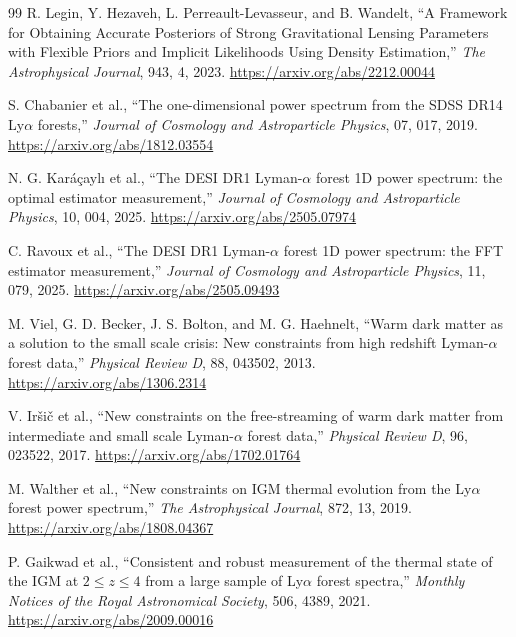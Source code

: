 \begin{thebibliography}{99}
R. Legin, Y. Hezaveh, L. Perreault-Levasseur, and B. Wandelt,
``A Framework for Obtaining Accurate Posteriors of Strong Gravitational Lensing Parameters with Flexible Priors and Implicit Likelihoods Using Density Estimation,''
\emph{The Astrophysical Journal}, 943, 4, 2023.
\url{https://arxiv.org/abs/2212.00044}

S. Chabanier et al.,
``The one-dimensional power spectrum from the SDSS DR14 Ly$\alpha$ forests,''
\emph{Journal of Cosmology and Astroparticle Physics}, 07, 017, 2019.
\url{https://arxiv.org/abs/1812.03554}

N. G. Kar\'a\c{c}ayl{\i} et al.,
``The DESI DR1 Lyman-$\alpha$ forest 1D power spectrum: the optimal estimator measurement,''
\emph{Journal of Cosmology and Astroparticle Physics}, 10, 004, 2025.
\url{https://arxiv.org/abs/2505.07974}

C. Ravoux et al.,
``The DESI DR1 Lyman-$\alpha$ forest 1D power spectrum: the FFT estimator measurement,''
\emph{Journal of Cosmology and Astroparticle Physics}, 11, 079, 2025.
\url{https://arxiv.org/abs/2505.09493}

M. Viel, G. D. Becker, J. S. Bolton, and M. G. Haehnelt,
``Warm dark matter as a solution to the small scale crisis: New constraints from high redshift Lyman-$\alpha$ forest data,''
\emph{Physical Review D}, 88, 043502, 2013.
\url{https://arxiv.org/abs/1306.2314}

V. Ir\v{s}i\v{c} et al.,
``New constraints on the free-streaming of warm dark matter from intermediate and small scale Lyman-$\alpha$ forest data,''
\emph{Physical Review D}, 96, 023522, 2017.
\url{https://arxiv.org/abs/1702.01764}

M. Walther et al.,
``New constraints on IGM thermal evolution from the Ly$\alpha$ forest power spectrum,''
\emph{The Astrophysical Journal}, 872, 13, 2019.
\url{https://arxiv.org/abs/1808.04367}

P. Gaikwad et al.,
``Consistent and robust measurement of the thermal state of the IGM at $2\le z\le4$ from a large sample of Ly$\alpha$ forest spectra,''
\emph{Monthly Notices of the Royal Astronomical Society}, 506, 4389, 2021.
\url{https://arxiv.org/abs/2009.00016}


\end{thebibliography}
